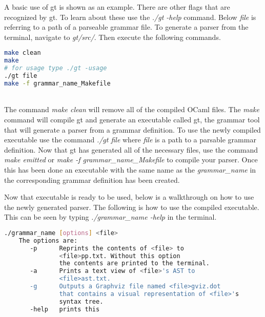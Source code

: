 \noindent A basic use of gt is shown as an example. There are other flags that 
are recognized by gt. To learn about these use the \textit{./gt -help} command. 
Below \textit{file} is referring to a path of a parseable grammar file. To generate
a parser from the terminal, navigate to \textit{gt/src/}. Then execute the following 
commands. \\

\begin{lstlisting}[language=bash]
make clean 
make 
# for usage type ./gt -usage
./gt file 
make -f grammar_name_Makefile 
\end{lstlisting}\ \\
\noindent The command \textit{make clean} will remove all of the compiled OCaml
files. The \textit{make} command will compile gt and generate an executable 
called gt, the grammar tool that will generate a parser from a grammar definition. To 
use the newly compiled executable use the command \textit{./gt file} where \textit{file} is a path to a parsable grammar 
definition. Now that gt has generated all of the necessary files, use the command \textit{make emitted} or 
\textit{make -f grammar\_name\_Makefile} to compile your parser. Once this has been done an executable with the same name as
the \textit{grammar\_name} in the corresponding grammar definition has been created. 

Now that executable is ready to be used, below is a walkthrough on how to use the
newly generated parser. The following is how to use the compiled executable. This can be seen by typing 
\textit{./grammar\_name -help} in the terminal.\\
\begin{lstlisting}[language=bash]
./grammar_name [options] <file> 
    The options are:
       -p      Reprints the contents of <file> to
               <file>pp.txt. Without this option
               the contents are printed to the terminal.
       -a      Prints a text view of <file>'s AST to 
               <file>ast.txt.
       -g      Outputs a Graphviz file named <file>gviz.dot
               that contains a visual representation of <file>'s
               syntax tree.
       -help   prints this
\end{lstlisting}







